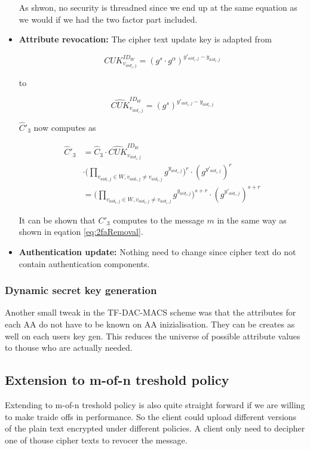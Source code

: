 \begin{itemize}
As shwon, no security is threadned since we end up at the same equation as we would if we had the two factor part included. 

\item \textbf{Attribute revocation:}
The cipher text update key is adapted from

$$
CUK^{ID_W}_{v_{aid_i,j}} = (g^s \cdotp g^\alpha)^{y'_{aid_i,j} - y_{aid_i,j}}
$$

to 

$$
\widehat{CUK}^{ID_W}_{v_{aid_i,j}} = (g^s)^{y'_{aid_i,j} - y_{aid_i,j}}
$$

$\widehat{C}'_3$ now computes as 

\begin{equation}
\begin{split}
\widehat{C}'_3 &= \widehat{C}_3 \cdotp \widehat{CUK}^{ID_W}_{v_{aid_i,j}} \\
&\cdotp \Big( \prod_{v_{aid_{t}, j}\in W, v_{aid_t, j} \neq v_{aid_i,j}} g^{y_{aid_{i}, j}} \Big)^{r} \cdotp (g^{y'_{aid_i,j}})^{r} \\
&= \Big( \prod_{v_{aid_{t}, j}\in W, v_{aid_t, j} \neq v_{aid_i,j}} g^{y_{aid_{i}, j}} \Big)^{s + r} \cdotp (g^{y'_{aid_i,j}})^{s + r}
\end{split}
\end{equation}

It can be shown that $C'_3$ computes to the message $m$ in the same way as shown in eqation \ref{eq:2faRemoval}.

\item \textbf{Authentication update:}
Nothing need to change since cipher text do not contain authentication components. 
\end{itemize}

\subsubsection{Dynamic secret key generation}
Another small tweak in the \ac{TF-DAC-MACS} scheme was that the attributes for each \ac{AA} do not have to be known on AA inizialisation. They can be creates as well on each users key gen. This reduces the universe of possible attribute values to thouse who are actually needed.

\subsection{Extension to m-of-n treshold policy}
Extending to m-of-n treshold policy is also quite straight forward if we are willing to make traide offs in performance. So the client could upload different versions of the plain text encrypted under different policies. A client only need to decipher one of thouse cipher texts to revocer the message.

